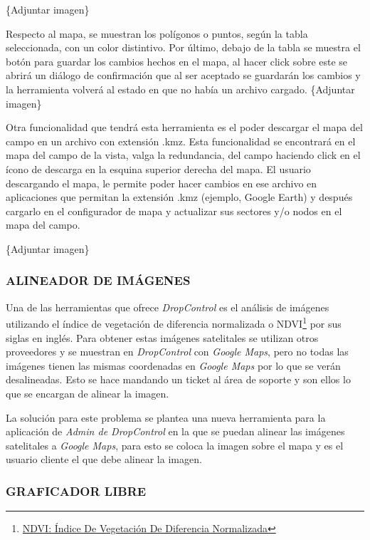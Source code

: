 \{Adjuntar imagen\}

Respecto al mapa, se muestran los polígonos o puntos, según la tabla seleccionada, con un color distintivo. Por último, debajo de la tabla se muestra el botón para guardar los cambios hechos en el mapa, al hacer click sobre este se abrirá un diálogo de confirmación que al ser aceptado se guardarán los cambios y la herramienta volverá al estado en que no había un archivo cargado.
\{Adjuntar imagen\}

Otra funcionalidad que tendrá esta herramienta es el poder descargar el mapa del campo en un archivo con extensión .kmz. Esta funcionalidad se encontrará en el mapa del campo de la vista, valga la redundancia, del campo haciendo click en el ícono de descarga en la esquina superior derecha del mapa. El usuario descargando el mapa, le permite poder hacer cambios en ese archivo en aplicaciones que permitan la extensión .kmz (ejemplo, Google Earth) y después cargarlo en el configurador de mapa y actualizar sus sectores y/o nodos en el mapa del campo.

\{Adjuntar imagen\}

\subsubsection{ALINEADOR DE IMÁGENES}

Una de las herramientas que ofrece \textit{DropControl} es el análisis de imágenes utilizando
el índice de vegetación de diferencia normalizada o NDVI\footnote{\href{https://eos.com/es/make-an-analysis/ndvi/}{NDVI: Índice De Vegetación De Diferencia Normalizada}} por sus siglas en inglés. Para obtener estas imágenes satelitales
se utilizan otros proveedores y se muestran en \textit{DropControl} con \textit{Google Maps}, pero no todas las imágenes tienen
las mismas coordenadas en \textit{Google Maps} por lo que se verán desalineadas. Esto se hace mandando un ticket al área de soporte
y son ellos lo que se encargan de alinear la imagen.

La solución para este problema se plantea una nueva herramienta para la aplicación de \textit{Admin de DropControl} en la que
se puedan alinear las imágenes satelitales a \textit{Google Maps}, para esto se coloca la imagen sobre el mapa y es el usuario cliente
el que debe alinear la imagen.

\subsubsection{GRAFICADOR LIBRE}

